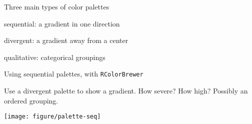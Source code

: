 \documentclass[table]{beamer}\usepackage[]{graphicx}\usepackage[]{color}
\makeatletter
\newcommand{\hlstr}[1]{\textcolor[rgb]{0.192,0.494,0.8}{#1}}%
\newcommand{\hlopt}[1]{\textcolor[rgb]{0,0,0}{#1}}%
\newcommand{\hlstd}[1]{\textcolor[rgb]{0.345,0.345,0.345}{#1}}%
\newcommand{\hlkwb}[1]{\textcolor[rgb]{0.69,0.353,0.396}{#1}}%
\newcommand{\hlkwd}[1]{\textcolor[rgb]{0.737,0.353,0.396}{\textbf{#1}}}%
\newenvironment{kframe}{%
 \def\at@end@of@kframe{}%
 \ifinner\ifhmode%
  \def\at@end@of@kframe{\end{minipage}}%
  \begin{minipage}{\columnwidth}%
 \fi\fi%
 \def\FrameCommand##1{\hskip\@totalleftmargin \hskip-\fboxsep
 \colorbox{shadecolor}{##1}\hskip-\fboxsep
     \hskip-\linewidth \hskip-\@totalleftmargin \hskip\columnwidth}%
 \MakeFramed {\advance\hsize-\width
   \@totalleftmargin\z@ \linewidth\hsize
   \@setminipage}}%
 {\par\unskip\endMakeFramed%
 \at@end@of@kframe}
\newenvironment{knitrout}{}{} %
\makeatother
\begin{document}

\begin{frame}[fragile]{Three main types of color palettes}


\bi
  \item sequential: a gradient in one direction
  \item divergent: a gradient away from a center
  \item qualitative: categorical groupings 
\ei


\end{frame}



\begin{frame}[fragile]{Using sequential palettes, with {\tt RColorBrewer}}

\begin{block}{Use a divergent palette to show a gradient.}
How severe? How high? Possibly an ordered grouping.

\texttt{[image: figure/palette-seq]}

\end{block}

\end{frame}


\end{document}
